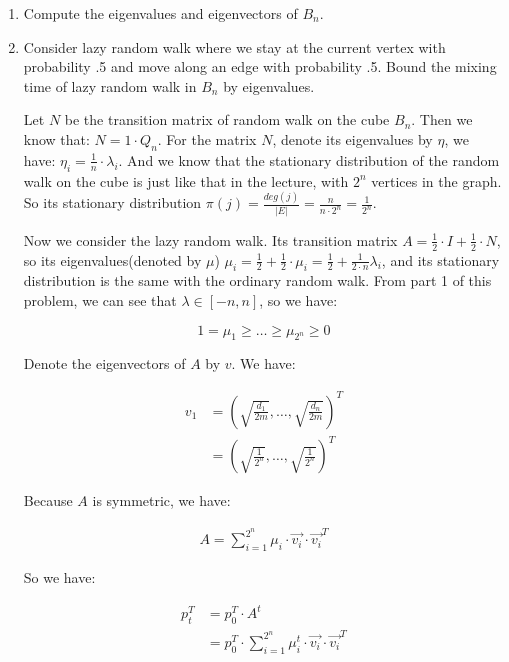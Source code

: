 \begin{enumerate}
	\item Compute the eigenvalues and eigenvectors of $B_n$.
	\item Consider lazy random walk where we stay at the current vertex with probability .5 and move along an edge with probability .5. Bound the mixing time of lazy random walk in	$B_n$ by eigenvalues.
	
  \Answer
	Let $N$ be the transition matrix of random walk on the cube $B_n$. Then we know that: $N = 1 \cdot Q_n$. For the matrix $N$, denote its eigenvalues by $\eta$, we have: $\eta_i = \frac{1}{n} \cdot \lambda_i$. And we know that the stationary distribution of the random walk on the cube is just like that in the lecture, with $2^n$ vertices in the graph. So its stationary distribution
  $\pi(j)=\frac{deg(j)}{|E|}= \frac{n}{n \cdot 2^n}=\frac{1}{2^n}$.

  Now we consider the lazy random walk. Its transition matrix $A= \frac{1}{2} \cdot I + \frac{1}{2} \cdot N$, so its eigenvalues(denoted by $\mu$) $\mu_i = \frac{1}{2} + \frac{1}{2} \cdot \mu_i =\frac{1}{2} + \frac{1}{2 \cdot n}\lambda_i$, and its stationary distribution is the same with the ordinary random walk. From part 1 of this problem, we can see that $\lambda \in [-n, n]$, so we have:

  \begin{equation}
    1 = \mu_1 \geq \dots \geq \mu_{2^n} \geq 0
  \end{equation}
  
  Denote the eigenvectors of $A$ by $v$. We have:

  \begin{align}
    v_1 &= (\sqrt{\frac{d_1}{2m}}, \dots, \sqrt{\frac{d_n}{2m}})^T \\
    &=(\sqrt{\frac{1}{2^n}}, \dots, \sqrt{\frac{1}{2^n}})^T
  \end{align}

  Because $A$ is symmetric, we have:

  \begin{align}
    A = \sum\limits_{i=1}^{2^n} \mu_i \cdot \overrightarrow{v_i} \cdot \overrightarrow{v_i}^T
  \end{align}

  So we have:
  
  \begin{align}
    p_t^T &= p_0^T \cdot A^t \\
    &= p_0^T \cdot \sum\limits_{i=1}^{2^n} \mu_i^t \cdot \overrightarrow{v_i} \cdot \overrightarrow{v_i}^T
  \end{align}


\end{enumerate}
